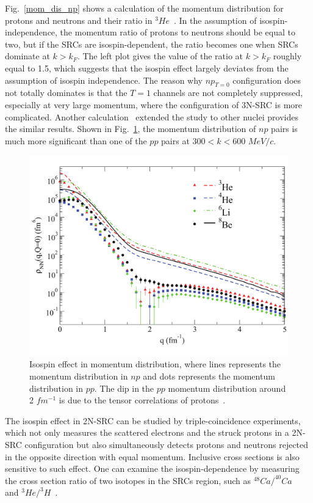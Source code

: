 Fig.~\ref{mom_dis_np} shows a calculation of the momentum distribution for protons and neutrons and their ratio in $^{3}He$~\cite{Pieper_Wiringa}. In the assumption of isospin-independence, the momentum ratio of protons to neutrons should be equal to two, but if the SRCs are isospin-dependent, the ratio becomes one when SRCs dominate at $k>k_{F}$. The left plot gives the value of the ratio at $k>k_{F}$ roughly equal to 1.5, which suggests that the isospin effect largely deviates from the assumption of isospin independence. The reason why $np_{T=0}$ configuration does not totally dominates is that the $T=1$ channels are not completely suppressed, especially at very large momentum, where the configuration of 3N-SRC is more complicated. Another calculation~\cite{PhysRevLett.98.132501} extended the study to other nuclei provides the similar results. Shown in Fig.~\ref{isospin_src}, the momentum distribution of $np$ pairs is much more significant than one of the $pp$ pairs at $300<k<600$ $MeV/c$.
\begin{figure}[!ht]
  \begin{center}
    \includegraphics[type=pdf,ext=.pdf,read=.pdf,width=0.60\linewidth]{./figures/physics/isospin_src}
    \caption[Isospin effect in momentum distribution]{\footnotesize{Isospin effect in momentum distribution, where lines represents the momentum distribution in $np$ and dots represents the momentum distribution in $pp$. The dip in the $pp$ momentum distribution around 2 $fm^{-1}$ is due to the tensor correlations of protons~\cite{src_john,PhysRevLett.98.132501}.}}
    \label{isospin_src}
  \end{center}
\end{figure} 

The isospin effect in 2N-SRC can be studied by triple-coincidence experiments, which not only measures the scattered electrons and the struck protons in a 2N-SRC configuration but also simultaneously detects protons and neutrons rejected in the opposite direction with equal momentum. Inclusive cross sections is also sensitive to such effect. One can examine the isospin-dependence by measuring the cross section ratio of two isotopes in the SRCs region, such as $^{48}Ca/^{40}Ca$~\cite{e08014_pr} and $^{3}He/^{3}H$~\cite{E12_11_112_pr}.

